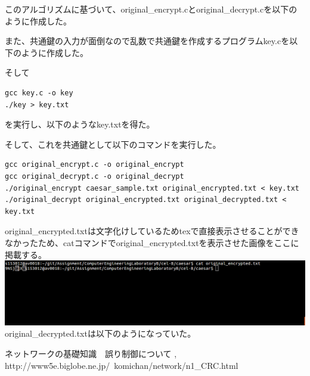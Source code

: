 \documentclass[a4j]{celb-report}
\begin{document}
このアルゴリズムに基づいて、original\_encrypt.cとoriginal\_decrypt.cを以下のように作成した。


また、共通鍵の入力が面倒なので乱数で共通鍵を作成するプログラムkey.cを以下のように作成した。

そして
\begin{lstlisting}[basicstyle=\ttfamily\footnotesize, frame=single]
gcc key.c -o key
./key > key.txt
\end{lstlisting}
を実行し、以下のようなkey.txtを得た。

そして、これを共通鍵として以下のコマンドを実行した。
\begin{lstlisting}[basicstyle=\ttfamily\footnotesize, frame=single]
gcc original_encrypt.c -o original_encrypt
gcc original_decrypt.c -o original_decrypt
./original_encrypt caesar_sample.txt original_encrypted.txt < key.txt
./original_decrypt original_encrypted.txt original_decrypted.txt < key.txt
\end{lstlisting}
original\_encrypted.txtは文字化けしているためtexで直接表示させることができなかったため、catコマンドでoriginal\_encrypted.txtを表示させた画像をここに掲載する。\\
\includegraphics[width=15cm]{../caesar/original_encrypted.png}\\
original\_decrypted.txtは以下のようになっていた。\\


\begin{thebibliography}{9}
 ネットワークの基礎知識　誤り制御について , http://www5e.biglobe.ne.jp/~komichan/network/n1\_CRC.html
\end{thebibliography}
%
\end{document}
